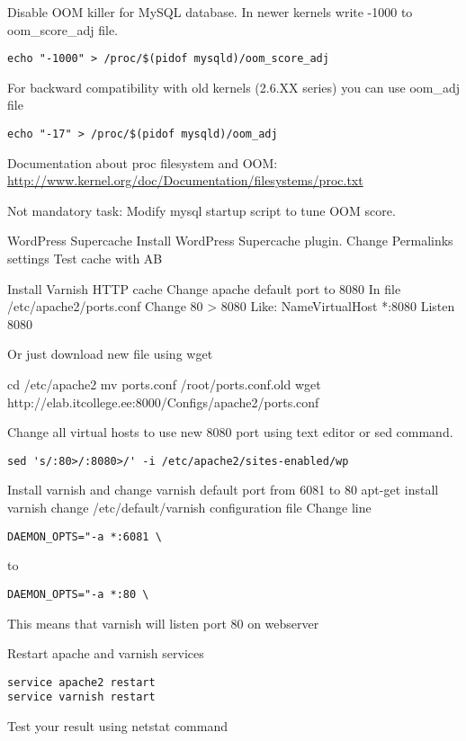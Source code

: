 Disable OOM killer for MySQL database. In newer kernels write -1000 to oom\_score\_adj file.

\begin{verbatim}
echo "-1000" > /proc/$(pidof mysqld)/oom_score_adj
\end{verbatim}
For backward compatibility with old kernels (2.6.XX series) you can use oom\_adj file
\begin{verbatim}
echo "-17" > /proc/$(pidof mysqld)/oom_adj
\end{verbatim}
Documentation about proc filesystem and OOM:
\url{http://www.kernel.org/doc/Documentation/filesystems/proc.txt}

Not mandatory task: Modify mysql startup script to tune OOM score. 

WordPress Supercache
Install WordPress Supercache plugin.
Change Permalinks settings
Test cache with AB

Install Varnish HTTP cache
Change apache default port to 8080
In file /etc/apache2/ports.conf
Change 80 > 8080
Like:
NameVirtualHost *:8080
Listen 8080

Or just download new file using wget 

cd /etc/apache2
mv ports.conf /root/ports.conf.old
wget http://elab.itcollege.ee:8000/Configs/apache2/ports.conf

Change all virtual hosts to use new 8080 port using text editor or sed command.

\begin{verbatim}
sed 's/:80>/:8080>/' -i /etc/apache2/sites-enabled/wp
\end{verbatim}


Install varnish and change varnish default port from 6081 to 80
apt-get install varnish
change /etc/default/varnish configuration file
Change line
\begin{verbatim}
DAEMON_OPTS="-a *:6081 \ 
\end{verbatim}
to
\begin{verbatim}
DAEMON_OPTS="-a *:80 \
\end{verbatim}

This means that varnish will listen port 80 on webserver

Restart apache and varnish services
\begin{verbatim}
service apache2 restart
service varnish restart
\end{verbatim}
Test your result using netstat command

